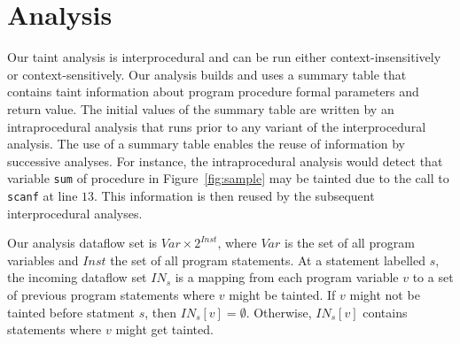 \section{Analysis}\label{stagedAnalysis}

\newcommand{\Aset}{\mathcal{A}}
\newcommand{\Pset}{\mathcal{P}}
\newcommand{\varset}{\mathit{Var}}
\newcommand{\instset}{\mathit{Inst}}
\newcommand{\procset}{\mathit{Proc}}
\newcommand{\formalsset}{\mathit{formals}}
\newcommand{\firstfunc}{\mathit{first}}
\newcommand{\toplevelfunc}{\mathit{toplevel}}
\newcommand{\pointsto}[2]{{pt}_{[#1]}(#2)}
\newcommand{\pointstobefore}[2]{{pt}_{[\overline{#1}]	}(#2)}
\newcommand{\pointstoafter}[2]{{pt}_{[\underline{#1}]}(#2)}

\newcommand{\myinflow}{\mathit{IN}}
\newcommand{\ifff}{\mathit{iff}}
\newcommand{\aand}{\mathit{and}}
\newcommand{\mybigcup}[2]{\mathlarger{\bigcup_{#1}^{#2}}}

\newcommand{\copydef}{$\text{COPY}\ [p = q]$}
\newcommand{\loaddef}{$\text{LOAD}\ [p = *q]$}
\newcommand{\addrofdef}{$\text{ADDROF}\ [p = \&a]$}
\newcommand{\storedef}{$\text{STORE}\ [*p = q]$}
\newcommand{\sourcedef}{$\text{SOURCE}\ [r = \text{call}\ \text{func}(a_0, a_1, ..., a_n)]$}
\newcommand{\calldef}{$\text{CALL} [r = \text{call}\ \text{func}(a_0, a_1, ..., a_n)]$}
\newcommand{\sinkdef}{$\text{SINK} [r = \text{call}\ \text{func}]$}

Our taint analysis is interprocedural and can be run
either context-insensitively or context-sensitively.
Our analysis builds and uses a summary table that contains
taint information about program procedure formal parameters
and return value.
The initial values of the summary table are written by
an intraprocedural analysis that runs prior to any variant
of the interprocedural analysis. The use of a summary table
enables the reuse of information by successive analyses.
For instance, the intraprocedural analysis would
detect that variable \texttt{sum} of procedure \compute{} in
Figure~\ref{fig:sample} may be tainted due to the call
to \texttt{scanf} at line $13$. This information is then
reused by the subsequent interprocedural analyses.

Our analysis dataflow set is $\varset \times 2^\instset$,
where $\varset$ is the set of all program variables and
$\instset$ the set of all program statements. 
At a statement labelled $s$, the incoming dataflow set $\myinflow_s$
is a mapping from each program variable $v$ to a set of
previous program statements where $v$ might be tainted.
If $v$ might not be tainted before statment $s$, then
$\myinflow_s[v] = \emptyset$. Otherwise, $\myinflow_s[v]$
contains statements where $v$ might get tainted.

